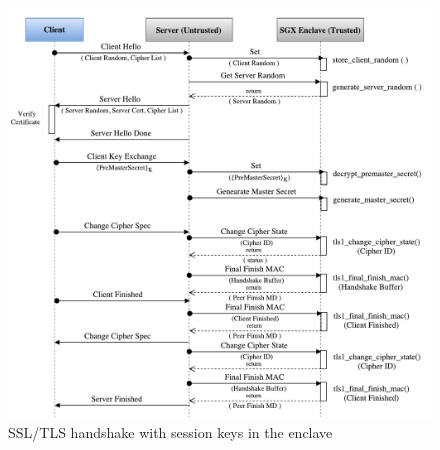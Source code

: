 \documentclass[../../main.tex]{subfiles}
\begin{document}
\begin{figure}[H]
  \centering
  \includegraphics[scale=0.4]{images/RSA-SGX-Handshake-SessionKeys.pdf}
  \caption{SSL/TLS handshake with session keys in the enclave}
  \label{fig:keys-inside}
\end{figure}
\end{document}
